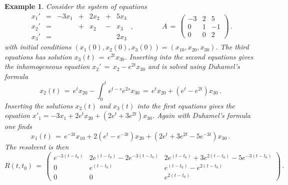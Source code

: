 \documentclass[12pt]{report}
\newtheorem{example}[theorem]{Example}
\begin{document}
\begin{example}{\rm  
Consider the system of equations
\begin{equation}
\begin{array}{ccccccc}
 x_1'   & =& -3 x_1 & + & 2 x_2 & + &   5 x_3  \\
 x_2'   & =&             & + &    x_2 & - &   x_3  \\
 x_3'   & =&             &    &            &    & 2 x_3  
\end{array} \,,
\quad  \quad \quad \quad
A\,=\, \left(\begin{array}{ccc}
-3 & 2& 5  \\ 0 & 1 & -1 \\ 0 & 0 & 2 \end{array}
\right)\,.
\end{equation}
with initial conditions $(x_1(0), x_2(0) , x_3(0)) = (x_{10}, x_{20} ,
x_{30})$. The third equations has solution $x_3(t) \,=\, e^{2t }
x_{30}$. Inserting into the second equations gives the inhomogeneous
equation
$x_2'  \,=\,   x_2  -   e^{2t} x_{30}$ 
and is solved using Duhamel's formula
\begin{equation}
x_2(t)  \,=\,   e^{t} x_{20} - \int_0^t e^{t-s} e^{2s} x_{30} \,=\,  
e^{t} x_{20} + (e^{t} - e^{2t}) x_{30} \,.
\end{equation}
Inserting the solutions $x_2(t)$ and $x_3(t)$ into the first
equations gives the equation $x'_1 = -3x_1 + 2 e^{t} x_{20} + (2 e^{t}
+ 3 e^{2t} ) x_{30}$. Again with Duhamel's formula one finds
\begin{equation}
x_1(t) \,=\, e^{-3 t} x_{10} + 2(e^t - e^{-3t}) x_{20} + (2e^t + 3e^{2t} 
- 5e^{-3t}) x_{30} \,.
\end{equation}
The resolvent is then
\begin{equation}
R(t,t_0) \,=\, \left(
\begin{array}{ccc}
e^{-3 (t-t_0)}&  2e^{(t-t_0)} - 2e^{-3(t-t_0)} & 2e^{(t-t_0)} + 3e^{2(t-t_0)} 
- 5e^{-3(t-t_0)}   \\
    0       &  e^{(t-t_0)}                  &  e^{(t-t_0)} - e^{2(t-t_0)}    \\
    0      &       0                    &     e^{2(t-t_0) }       
\end{array} \right)\,.
\end{equation}
}
\end{example}
\end{document}
